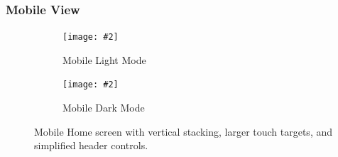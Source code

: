 \documentclass[11pt,a4paper]{article}
\newcommand{\maxgraph}[2][]{%
  \texttt{[image: \#2]}%
}
\begin{document}
\subsubsection*{Mobile View}
\FloatBarrier
\begin{figure}[H]
  \centering
  \begin{subfigure}{0.48\linewidth}
    \maxgraph[width=\linewidth]{home_lightmode_mobile.jpg}
    \caption{Mobile Light Mode}
  \end{subfigure}\hfill
  \begin{subfigure}{0.48\linewidth}
    \maxgraph[width=\linewidth]{home_darkmode_mobile.jpg}
    \caption{Mobile Dark Mode}
  \end{subfigure}
  \caption{Mobile Home screen with vertical stacking, larger touch targets, and simplified header controls.}
  \label{fig:home_mobile}
\end{figure}
\FloatBarrier
\end{document}
